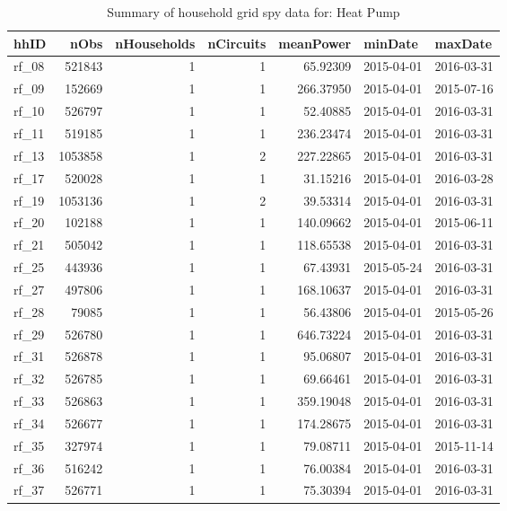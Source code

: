 \documentclass[]{article}
\begin{document}
\begin{table}

\caption{\label{tab:sumamrise loaded data}Summary of household grid spy data for: Heat Pump}
\centering
\begin{tabular}[t]{l|r|r|r|r|l|l}
\hline
hhID & nObs & nHouseholds & nCircuits & meanPower & minDate & maxDate\\
\hline
rf\_08 & 521843 & 1 & 1 & 65.92309 & 2015-04-01 & 2016-03-31\\
\hline
rf\_09 & 152669 & 1 & 1 & 266.37950 & 2015-04-01 & 2015-07-16\\
\hline
rf\_10 & 526797 & 1 & 1 & 52.40885 & 2015-04-01 & 2016-03-31\\
\hline
rf\_11 & 519185 & 1 & 1 & 236.23474 & 2015-04-01 & 2016-03-31\\
\hline
rf\_13 & 1053858 & 1 & 2 & 227.22865 & 2015-04-01 & 2016-03-31\\
\hline
rf\_17 & 520028 & 1 & 1 & 31.15216 & 2015-04-01 & 2016-03-28\\
\hline
rf\_19 & 1053136 & 1 & 2 & 39.53314 & 2015-04-01 & 2016-03-31\\
\hline
rf\_20 & 102188 & 1 & 1 & 140.09662 & 2015-04-01 & 2015-06-11\\
\hline
rf\_21 & 505042 & 1 & 1 & 118.65538 & 2015-04-01 & 2016-03-31\\
\hline
rf\_25 & 443936 & 1 & 1 & 67.43931 & 2015-05-24 & 2016-03-31\\
\hline
rf\_27 & 497806 & 1 & 1 & 168.10637 & 2015-04-01 & 2016-03-31\\
\hline
rf\_28 & 79085 & 1 & 1 & 56.43806 & 2015-04-01 & 2015-05-26\\
\hline
rf\_29 & 526780 & 1 & 1 & 646.73224 & 2015-04-01 & 2016-03-31\\
\hline
rf\_31 & 526878 & 1 & 1 & 95.06807 & 2015-04-01 & 2016-03-31\\
\hline
rf\_32 & 526785 & 1 & 1 & 69.66461 & 2015-04-01 & 2016-03-31\\
\hline
rf\_33 & 526863 & 1 & 1 & 359.19048 & 2015-04-01 & 2016-03-31\\
\hline
rf\_34 & 526677 & 1 & 1 & 174.28675 & 2015-04-01 & 2016-03-31\\
\hline
rf\_35 & 327974 & 1 & 1 & 79.08711 & 2015-04-01 & 2015-11-14\\
\hline
rf\_36 & 516242 & 1 & 1 & 76.00384 & 2015-04-01 & 2016-03-31\\
\hline
rf\_37 & 526771 & 1 & 1 & 75.30394 & 2015-04-01 & 2016-03-31\\

\end{tabular}
\end{table}
\end{document}
